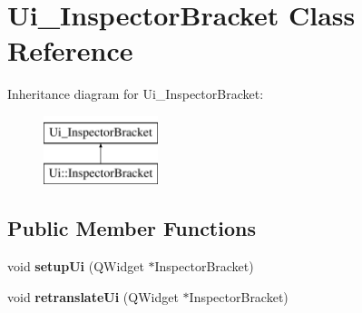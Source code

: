 \hypertarget{class_ui___inspector_bracket}{}\section{Ui\+\_\+\+Inspector\+Bracket Class Reference}
\label{class_ui___inspector_bracket}
Inheritance diagram for Ui\+\_\+\+Inspector\+Bracket\+:\begin{figure}[H]
\begin{center}
\leavevmode
\includegraphics[height=2.000000cm]{class_ui___inspector_bracket}
\end{center}
\end{figure}
\subsection*{Public Member Functions}
\begin{DoxyCompactItemize}
\item 
\mbox{\label{class_ui___inspector_bracket_a489cb26f296a747d29b6872e63648ca6}} 
void {\bfseries setup\+Ui} (Q\+Widget $\ast$Inspector\+Bracket)
\item 
\mbox{\label{class_ui___inspector_bracket_a051a5d503c92ba04bd3023dcc171f0ee}} 
void {\bfseries retranslate\+Ui} (Q\+Widget $\ast$Inspector\+Bracket)
\end{DoxyCompactItemize}
